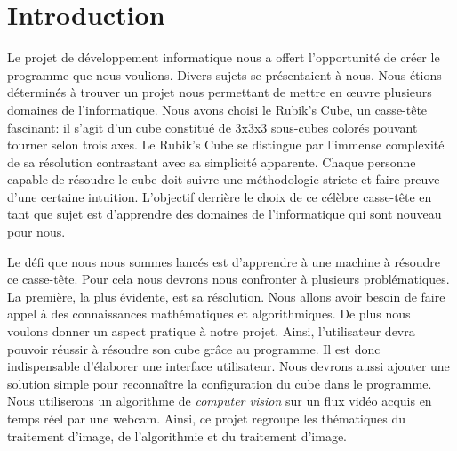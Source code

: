 \chapter*{Introduction}

Le projet de développement informatique nous a offert l'opportunité de créer le programme que nous voulions.
Divers sujets se présentaient à nous. Nous étions déterminés à trouver un projet nous permettant de mettre en œuvre plusieurs domaines de l'informatique.
Nous avons choisi le Rubik's Cube, un casse-tête fascinant: il s'agit d'un cube constitué de 3x3x3 sous-cubes colorés pouvant tourner selon trois axes.
Le Rubik's Cube se distingue par l'immense complexité de sa résolution contrastant avec sa simplicité apparente.
Chaque personne capable de résoudre le cube doit suivre une méthodologie stricte et faire preuve d'une certaine intuition.
L'objectif derrière le choix de ce célèbre casse-tête en tant que sujet est d'apprendre des domaines de l'informatique qui sont nouveau pour nous.

Le défi que nous nous sommes lancés est d'apprendre à une machine à résoudre ce casse-tête.
Pour cela nous devrons nous confronter à plusieurs problématiques.
La première, la plus évidente, est sa résolution. Nous allons avoir besoin de faire appel à des connaissances mathématiques et algorithmiques.
De plus nous voulons donner un aspect pratique à notre projet. Ainsi, l'utilisateur devra pouvoir réussir à résoudre son cube grâce au programme.
Il est donc indispensable d'élaborer une interface utilisateur.
Nous devrons aussi ajouter une solution simple pour reconnaître la configuration du cube dans le programme. Nous utiliserons un algorithme de \textit{computer vision} sur un flux vidéo acquis en temps réel par une webcam.
Ainsi, ce projet regroupe les thématiques du traitement d'image, de l'algorithmie et du traitement d'image.

